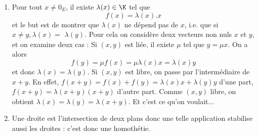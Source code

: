 \begin{enumerate}
 \item Pour tout $x \neq 0_E$, il existe $\lambda(x) \in \K$ tel que
$$
f(x)=\lambda(x) . x
$$
et le but est de montrer que $\lambda(x)$ ne dépend pas de $x$, i.e. que si $x \neq y, \lambda(x)=$ $\lambda(y)$. Pour cela on considère deux vecteurs non nuls $x$ et $y$, et on examine deux cas :
Si $(x, y)$ est liée, il existe $\mu$ tel que $y=\mu x$. On a alors
$$
f(y)=\mu f(x)=\mu \lambda(x) x=\lambda(x) y
$$
et donc $\lambda(x)=\lambda(y)$.
Si $(x, y)$ est libre, on passe par l'intermédiaire de $x+y$. En effet, $f(x+y)=f(x)+f(y)=\lambda(x) x+\lambda(y) y$ d'une part,
$f(x+y)=\lambda(x+y)(x+y)$ d'autre part.
Comme $(x, y)$ libre, on obtient $\lambda(x)=\lambda(y)=\lambda(x+y)$. Et c'est ce qu'on voulait...
\item Une droite est l'intersection de deux plans donc une telle application stabilise aussi les droites : c'est donc une homothétie.
\end{enumerate}
